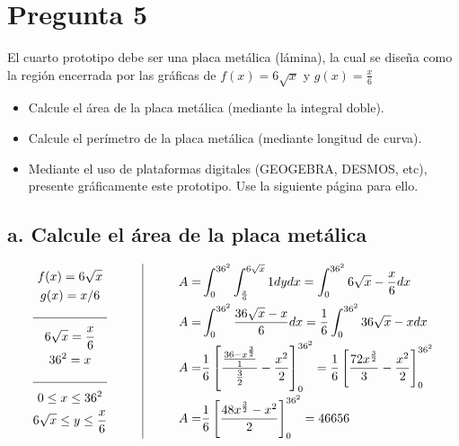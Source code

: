 \section*{Pregunta 5}
\noindent El cuarto prototipo debe ser una placa metálica (lámina),
la cual se diseña como la región encerrada por las gráficas de \(f(x)
= 6\sqrt{x}\) y \(g(x) = \frac{x}{6}\)

\begin{itemize}
  \item[a.] Calcule el área de la placa metálica (mediante la integral doble).
  \item[b.] Calcule el perímetro de la placa metálica (mediante
    longitud de curva).
  \item[d.] Mediante el uso de plataformas digitales (GEOGEBRA,
    DESMOS, etc), presente gráficamente este prototipo. Use la
    siguiente página para ello.
\end{itemize}

\subsection*{a. Calcule el área de la placa metálica}
\vspace{-0.5cm}
\begin{center}
  \[
    \begin{array}{c@{\hspace{1cm}}|@{\hspace{1cm}}c}
      \begin{gathered}
        f(x) = 6\sqrt{x} \\
        g(x) = x/6 \\
        \hrulefill \\
        6\sqrt{x} = \frac{x}{6} \\
        36^2 = x \\
        \hrulefill \\
        0 \le x \le 36^2 \\
        6\sqrt{x} \le y \le \frac{x}{6}
      \end{gathered}
      &
      \begin{aligned}
        A =& \int_0^{36^2} \int_{\frac{x}{6}}^{6\sqrt{x}} 1 dy dx =
        \int_0^{36^2} 6\sqrt{x} - \frac{x}{6} dx \\
        A =& \int_0^{36^2} \frac{36\sqrt{x} - x}{6} dx = \frac{1}{6}
        \int_0^{36^2} 36\sqrt{x} - x dx \\
        A =& \frac{1}{6}
        \left[\frac{\frac{36-x^{\frac{3}{2}}}{1}}{\frac{3}{2}} -
        \frac{x^2}{2}\right]_0^{36^2} =
        \frac{1}{6} \left[\frac{72x^{\frac{3}{2}}}{3} -
        \frac{x^2}{2}\right]_0^{36^2} \\
        A =& \frac{1}{6} \left[\frac{48x^{\frac{3}{2}} -
        x^2}{2}\right]_0^{36^2} = 46656
      \end{aligned}
    \end{array}
  \]
\end{center}

